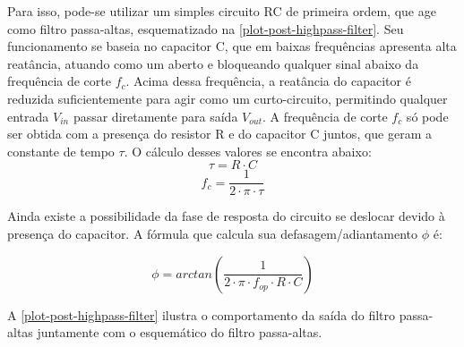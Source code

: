 	Para isso, pode-se utilizar um simples circuito RC de primeira ordem, que age como filtro passa-altas, esquematizado na \autoref{plot-post-highpass-filter}. Seu funcionamento se baseia no capacitor C, que em baixas frequências apresenta alta reatância, atuando como um aberto e bloqueando qualquer sinal abaixo da frequência de corte $f_{c}$. Acima dessa frequência, a reatância do capacitor é reduzida suficientemente para agir como um curto-circuito, permitindo qualquer entrada $V_{in}$ passar diretamente para saída $V_{out}$. A frequência de corte $f_{c}$ só pode ser obtida com a presença do resistor R e do capacitor C juntos, que geram a constante de tempo $\tau$. O cálculo desses valores se encontra abaixo:
	\begin{equation}
	\tau = R \cdot C
	\end{equation}
	\begin{equation}
	f_{c} = \frac{1}{2 \cdot \pi \cdot \tau}
	\end{equation}

	Ainda existe a possibilidade da fase de resposta do circuito se deslocar devido à presença do capacitor. A fórmula que calcula sua defasagem/adiantamento $\phi$ é:

	\begin{equation}
	\phi = arctan{\left(\frac{1}{2 \cdot \pi \cdot f_{op} \cdot R \cdot C}\right)}
	\end{equation}

	A \autoref{plot-post-highpass-filter} ilustra o comportamento da saída do filtro passa-altas juntamente com o esquemático do filtro passa-altas.

